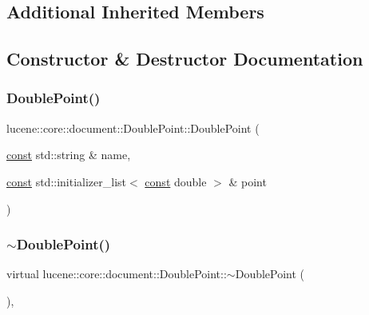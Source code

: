 \subsection*{Additional Inherited Members}


\subsection{Constructor \& Destructor Documentation}
\mbox{\label{classlucene_1_1core_1_1document_1_1DoublePoint_af18300dfcbaa7b925acef0e6e8a3c103}} 
\subsubsection{\texorpdfstring{Double\+Point()}{DoublePoint()}}
{\footnotesize\ttfamily lucene\+::core\+::document\+::\+Double\+Point\+::\+Double\+Point (\begin{DoxyParamCaption}\item[{\mbox{\hyperlink{ZlibCrc32_8h_a2c212835823e3c54a8ab6d95c652660e}{const}} std\+::string \&}]{name,  }\item[{\mbox{\hyperlink{ZlibCrc32_8h_a2c212835823e3c54a8ab6d95c652660e}{const}} std\+::initializer\+\_\+list$<$ \mbox{\hyperlink{ZlibCrc32_8h_a2c212835823e3c54a8ab6d95c652660e}{const}} double $>$ \&}]{point }\end{DoxyParamCaption})\hspace{0.3cm}{\ttfamily [inline]}}

\mbox{\label{classlucene_1_1core_1_1document_1_1DoublePoint_a56bcf2eb9f2d4102e9da8f6fa1eddd9d}} 
\subsubsection{\texorpdfstring{$\sim$\+Double\+Point()}{~DoublePoint()}}
{\footnotesize\ttfamily virtual lucene\+::core\+::document\+::\+Double\+Point\+::$\sim$\+Double\+Point (\begin{DoxyParamCaption}{ }\end{DoxyParamCaption})\hspace{0.3cm}{\ttfamily [inline]}, {\ttfamily [virtual]}}




